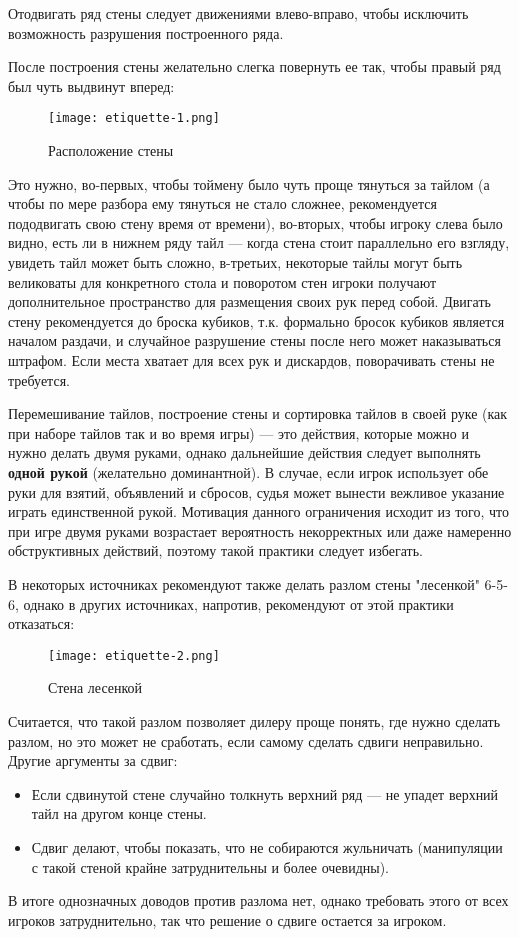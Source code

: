 Отодвигать ряд стены следует движениями влево-вправо, чтобы исключить возможность разрушения построенного ряда.

После построения стены желательно слегка повернуть ее так, чтобы правый ряд был чуть выдвинут вперед:

\begin{figure}[H]
	\centering
	\texttt{[image: etiquette-1.png]}
	\caption{Расположение стены}
\end{figure}

Это нужно, во-первых, чтобы тоймену было чуть проще тянуться за тайлом (а чтобы по мере разбора ему тянуться не стало сложнее, рекомендуется пододвигать свою стену время от времени), во-вторых, чтобы игроку слева было видно, есть ли в нижнем ряду тайл --- когда стена стоит параллельно его взгляду, увидеть тайл может быть сложно, в-третьих, некоторые тайлы могут быть великоваты для конкретного стола и поворотом стен игроки получают дополнительное пространство для размещения своих рук перед собой. Двигать стену рекомендуется до броска кубиков, т.к. формально бросок кубиков является началом раздачи, и случайное разрушение стены после него может наказываться штрафом. Если места хватает для всех рук и дискардов, поворачивать стены не требуется.

Перемешивание тайлов, построение стены и сортировка тайлов в своей руке (как при наборе тайлов так и во время игры) --- это действия, которые можно и нужно делать двумя руками, однако дальнейшие действия следует выполнять \textbf{одной рукой} (желательно доминантной). В случае, если игрок использует обе руки для взятий, объявлений и сбросов, судья может вынести вежливое указание играть единственной рукой. Мотивация данного ограничения исходит из того, что при игре двумя руками возрастает вероятность некорректных или даже намеренно обструктивных действий, поэтому такой практики следует избегать.

В некоторых источниках рекомендуют также делать разлом стены "лесенкой" 6-5-6, однако в других источниках, напротив, рекомендуют от этой практики отказаться:

\begin{figure}[H]
	\centering
	\texttt{[image: etiquette-2.png]}
	\caption{Стена лесенкой}
\end{figure}

Считается, что такой разлом позволяет дилеру проще понять, где нужно сделать разлом, но это может не сработать, если самому сделать сдвиги неправильно. Другие аргументы за сдвиг:
\begin{itemize}
	\item Если сдвинутой стене случайно толкнуть верхний ряд --- не упадет верхний тайл на другом конце стены.
	\item Сдвиг делают, чтобы показать, что не собираются жульничать (манипуляции с такой стеной крайне затруднительны и  более очевидны).
\end{itemize} 
В итоге однозначных доводов против разлома нет, однако требовать этого от всех игроков затруднительно, так что решение о сдвиге остается за игроком.

